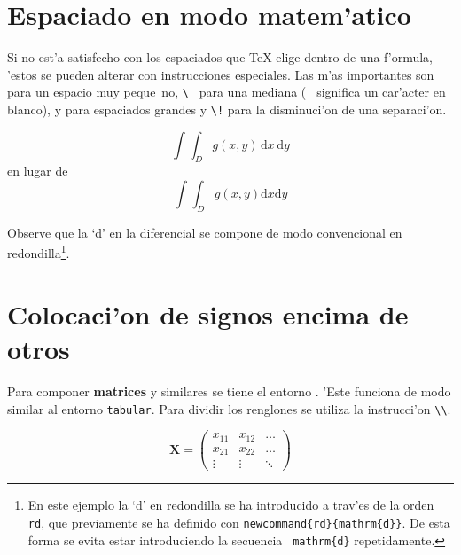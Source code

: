 \section{Espaciado en modo matem'atico}

Si no est'a satisfecho con los espaciados que \TeX{} elige dentro de
una f'ormula, 'estos se pueden alterar con instrucciones especiales.
Las m'as importantes son \ci{,} para un espacio muy peque~no, %
\verb*.\ .  para una mediana (\verb*. . significa un car'acter en
blanco),  y  para espaciados grandes y
\verb|\!|  para la disminuci'on de una separaci'on.

\begin{example}
\newcommand{\rd}{\mathrm{d}}
\begin{displaymath}
\int\!\!\!\int_{D} g(x,y)
  \, \rd x\, \rd y
\end{displaymath}
en lugar de
\begin{displaymath}
\int\int_{D} g(x,y)\rd x \rd y
\end{displaymath}
\end{example}
Observe que la `d' en la diferencial se compone de modo convencional
en redondilla\footnote{En este ejemplo la `d' en redondilla se ha
  introducido a trav'es de la orden \texttt{\bs rd}, que previamente
  se ha definido con \texttt{\bs newcommand\{\bs rd\}\{\bs mathrm\{d\}\}}.
  De esta forma se evita estar introduciendo la secuencia \texttt{\bs
    mathrm\{d\}} repetidamente.}.
 
\section{Colocaci'on de signos encima de otros}
\label{sec:vert}

Para componer \textbf{matrices} y similares se tiene el entorno
. 'Este funciona de modo similar al entorno \texttt{tabular}.
Para dividir los renglones se utiliza la instrucci'on \verb|\\|.

\begin{example}
\begin{displaymath}
\mathbf{X} =
\left( \begin{array}{ccc}
x_{11} & x_{12} & \ldots \\
x_{21} & x_{22} & \ldots \\
\vdots & \vdots & \ddots
\end{array} \right)
\end{displaymath}
\end{example}

